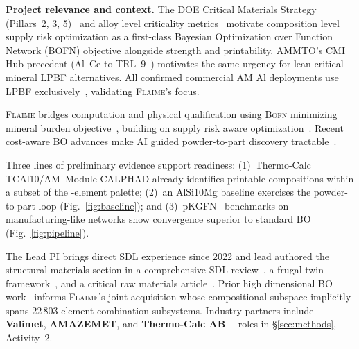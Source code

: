 \documentclass[11pt,letterpaper]{article}
\newcommand{\flaime}{\textsc{Flaime}}
\newcommand{\bofn}{\textsc{Bofn}}
\newcommand{\kmin}{2}                    %
\newcommand{\kmax}{8}                    %
\newcounter{elemctr}
\newcommand{\elementcount}{\theelemctr}  %
\newcommand{\subsystemcount}{22\,803}    %
\begin{document}
\textbf{Project relevance and context.}
The DOE Critical Materials Strategy (Pillars~2, 3, 5)~\cite{bauer_2023_1998242} and alloy level criticality metrics~\cite{titirici_2022_roadmap,graedel_2022_s4146702} motivate composition level supply risk optimization as a first-class Bayesian Optimization over Function Network (BOFN) objective alongside strength and printability. AMMTO's CMI Hub precedent (Al--Ce to TRL~9~\cite{lograsso_2024_2338076}) motivates the same urgency for lean critical mineral LPBF alternatives.  All confirmed commercial AM Al deployments 
use LPBF exclusively~\cite{wang_2024_ma171125,france_2019_scalmalloy,gradl_2022_s1166502,klippstein_2019_bracket,montanari_2023_met13040}, validating \flaime{}'s focus.

\flaime{} bridges computation and physical qualification using \bofn{} minimizing mineral burden
objective~\cite{astudillo_2019_icml,astudillo_2021_21121531}, building on
supply risk aware optimization~\cite{mulukutla_2024_ssrn4968}. Recent
cost-aware BO advances make AI guided powder-to-part discovery
tractable~\cite{chawla_2025_arxiv251116930}.

Three lines of preliminary evidence support readiness:
(1)~Thermo-Calc TCAl10/AM~Module CALPHAD already identifies printable
compositions within a subset of the \elementcount-element palette;
(2)~an AlSi10Mg baseline exercises the
powder-to-part loop
(Fig.~\ref{fig:baseline}); and
(3)~pKGFN~\cite{buathong_2023_23110214} benchmarks on manufacturing-like
networks show convergence superior to standard BO
(Fig.~\ref{fig:pipeline}).

The Lead PI brings direct SDL experience since 2022 
and lead authored the structural materials section in a comprehensive
SDL review~\cite{tom_2024_acschemr}, a frugal twin
framework~\cite{lo_2024_d3dd0022}, and a critical raw materials
article~\cite{titirici_2022_roadmap}. Prior high dimensional BO
work~\cite{baird_2022_commatsci,baird_2023_dib} informs \flaime{}'s
joint acquisition whose compositional subspace implicitly spans
\subsystemcount{} element combination subsystems.  Industry partners include 
\textbf{Valimet},
\textbf{AMAZEMET},
 and \textbf{Thermo-Calc AB} 
---roles in \S\ref{sec:methods}, Activity~2.
\end{document}
